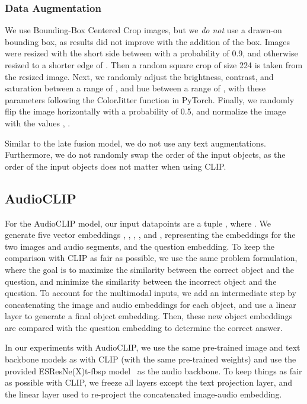 \documentclass[runningheads]{llncs}
\begin{document}
\subsubsection{Data Augmentation}

We use Bounding-Box Centered Crop images, but we \textit{do not} use a drawn-on bounding box, as results did not improve with the addition of the box. Images were resized with the short side between  with a probability of 0.9, and otherwise resized to a shorter edge of . Then a random square crop of size 224 is taken from the resized image. Next, we randomly adjust the brightness, contrast, and saturation between a range of , and hue between a range of , with these parameters following the ColorJitter function in PyTorch. Finally, we randomly flip the image horizontally with a probability of 0.5, and normalize the image with the values , .

Similar to the late fusion model, we do not use any text augmentations. Furthermore, we do not randomly swap the order of the input objects, as the order of the input objects does not matter when using CLIP. 

\subsection{AudioCLIP~\cite{guzhov2021audioclip}}

For the AudioCLIP model, our input datapoints are a tuple , where . We generate five vector embeddings , , , , and , representing the embeddings for the two images and audio segments, and the question embedding. To keep the comparison with CLIP as fair as possible, we use the same problem formulation, where the goal is to maximize the similarity between the correct object and the question, and minimize the similarity between the incorrect object and the question. To account for the multimodal inputs, we add an intermediate step by concatenating the image and audio embeddings for each object, and use a linear layer to generate a final object embedding. Then, these new object embeddings are compared with the question embedding to determine the correct answer. 

In our experiments with AudioCLIP, we use the same pre-trained image and text backbone models as with CLIP (with the same pre-trained weights) and use the provided ESResNe(X)t-fbsp model~\cite{guzhov2021esresnextfbsp} as the audio backbone. To keep things as fair as possible with CLIP, we freeze all layers except the text projection layer, and the linear layer used to re-project the concatenated image-audio embedding.  
\end{document}
